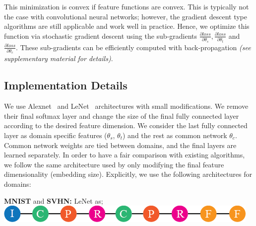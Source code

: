 
This minimization is convex if feature functions are convex. This is typically not the case with convolutional neural networks; however, the gradient descent type algorithms are still applicable and work well in practice. Hence, we optimize this function via stochastic gradient descent using the sub-gradients $\frac{\partial loss}{\partial \theta_s}, \frac{\partial loss}{\partial \theta_t}$ and $\frac{\partial loss}{\partial \theta_c}$. These sub-gradients can be efficiently computed with back-propagation \emph{(see supplementary material for details)}.


\subsection{Implementation Details}
\label{imp_det}
We use Alexnet~\cite{alexnet} and LeNet~\cite{lenet} architectures with small modifications. We remove their final softmax layer and change the size of the final fully connected layer according to the desired feature dimension. We consider the last fully connected layer as domain specific features ($\theta_s$, $\theta_t$) and the rest as common network $\theta_c$. Common network weights are tied between domains, and the final layers are learned separately. In order to have a fair comparison with existing algorithms, we follow the same architecture used by \cite{ganin15} only modifying the final feature dimensionality (embedding size). Explicitly, we use the following architectures for domains:

\noindent \textbf{MNIST} and \textbf{SVHN:} LeNet\cite{lenet} as; \includegraphics[width=0.40\columnwidth]{lenet}

